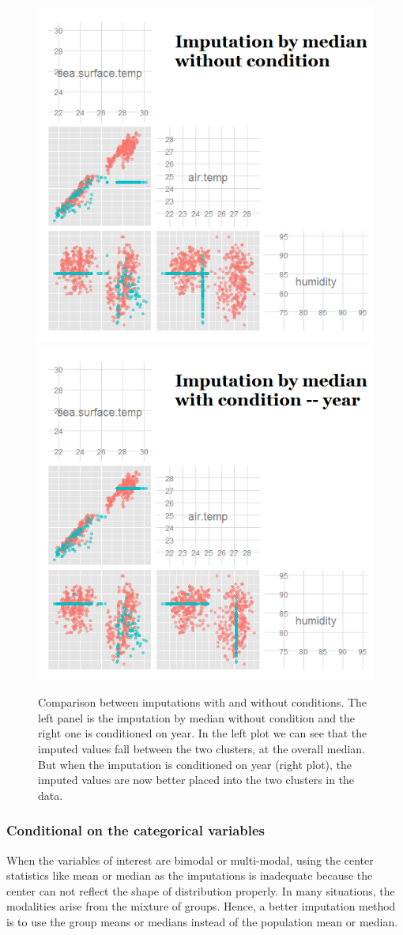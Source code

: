 \documentclass[article]{jss}
\begin{document}
\begin{center}
\begin{figure}[h]
\begin{centering}
\includegraphics[width=.48\textwidth]{fig4-1}
\includegraphics[width=.48\textwidth]{fig4-2}
\par\end{centering}
\caption{Comparison between imputations with and without conditions. The left panel is the imputation by median without condition and the right one is conditioned on year. In the left plot we can see that the imputed values fall between the two clusters, at the overall median. But when the imputation is conditioned on year (right plot), the imputed values are now better placed into the two clusters in the data.}
\label{fig: condition}
\end{figure}
\par\end{center}

\subsubsection{Conditional on the categorical variables}

When the variables of interest are bimodal or multi-modal, using the center statistics like mean or median as the imputations is inadequate because the center can not reflect the shape of distribution properly. In many situations, the modalities arise from the mixture of groups. Hence, a better imputation method is to use the group means or medians instead of the population mean or median.
\end{document}
